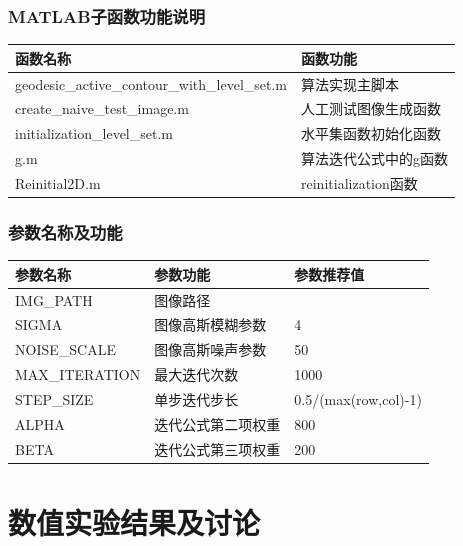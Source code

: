 \documentclass[a4paper, UTF8]{ctexrep}
\begin{document}
		\subsubsection{MATLAB子函数功能说明} %
		\label{ssub:matlab子函数功能说明}
			\begin{table}[htbp!]
				\centering
				\begin{tabular}{ll}
					\hline
					函数名称 & 函数功能 \\
					\hline
					geodesic\_active\_contour\_with\_level\_set.m & 算法实现主脚本 \\
					create\_naive\_test\_image.m & 人工测试图像生成函数 \\
					initialization\_level\_set.m & 水平集函数初始化函数 \\
					g.m & 算法迭代公式中的g函数 \\
					Reinitial2D.m & reinitialization函数 \\
					\hline
				\end{tabular}
			\end{table}
			\clearpage
		
		\subsubsection{参数名称及功能} %
		\label{ssub:参数名称及功能}
			\begin{table}[htbp!]
				\centering
				\begin{tabular}{lll}
					\hline
					参数名称 & 参数功能 & 参数推荐值 \\
					\hline
					IMG\_PATH & 图像路径 & 　　\\
					SIGMA & 图像高斯模糊参数 & 4 \\
					NOISE\_SCALE & 图像高斯噪声参数 & 50 \\
					MAX\_ITERATION & 最大迭代次数 & 1000 \\
					STEP\_SIZE & 单步迭代步长 & 0.5/(max(row,col)-1) \\
					ALPHA & 迭代公式第二项权重 & 800 \\
					BETA & 迭代公式第三项权重 & 200 \\
					\hline
				\end{tabular}
			\end{table}
		
	\section{数值实验结果及讨论} %
	\label{sec:数值实验结果及讨论}
\end{document}
